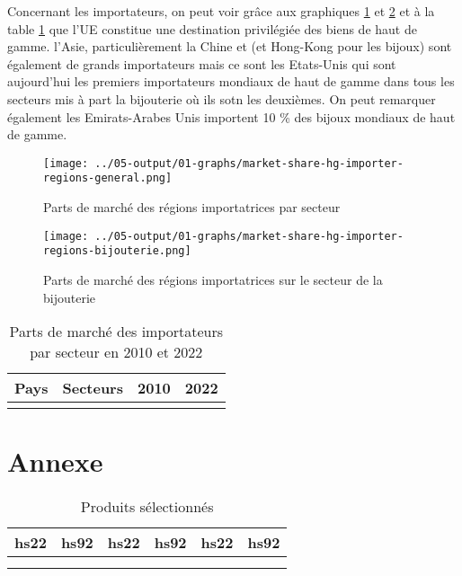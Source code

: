 \documentclass[french,10pt,a4paper]{article}
\begin{document}
Concernant les importateurs, on peut voir grâce aux graphiques \ref{fig:market-share-hg-importer-regions-general} et \ref{fig:market-share-hg-importer-regions-bijouterie} et à la table \ref{tab:market-share-country-importer} que l'UE constitue une destination privilégiée des biens de haut de gamme. l'Asie, particulièrement la Chine et (et Hong-Kong pour les bijoux) sont également de grands importateurs mais ce sont les Etats-Unis qui sont aujourd'hui les premiers importateurs mondiaux de haut de gamme dans tous les secteurs mis à part la bijouterie où ils sotn les deuxièmes. On peut remarquer également les Emirats-Arabes Unis importent 10 \% des bijoux mondiaux de haut de gamme. 

\begin{figure}[!h]
  \centering \texttt{[image: ../05-output/01-graphs/market-share-hg-importer-regions-general.png]}
  \caption{Parts de marché des régions importatrices par secteur}
  \label{fig:market-share-hg-importer-regions-general}
\end{figure}

\begin{figure}[!h]
  \centering \texttt{[image: ../05-output/01-graphs/market-share-hg-importer-regions-bijouterie.png]}
  \caption{Parts de marché des régions importatrices sur le secteur de la bijouterie}
  \label{fig:market-share-hg-importer-regions-bijouterie}
\end{figure}

\begin{table}[ht]
  \centering
  \begin{tabular}{lrrr}
    \hline
   Pays & Secteurs & 2010 & 2022 \\
    \hline
    \\
    \hline
  \end{tabular}
  \caption{Parts de marché des importateurs par secteur en 2010 et 2022}
  \label{tab:market-share-country-importer}
\end{table}





\newpage
\section{Annexe}

\begin{longtable}{|ll|ll|ll|}
  hs22 & hs92 & hs22 & hs92 & hs22 & hs92 \\
  \hline 
  \\
  \hline 
  \caption{Produits sélectionnés}
  \label{tab:table-products-init}
 \end{longtable}


 
\newpage


\end{document}
